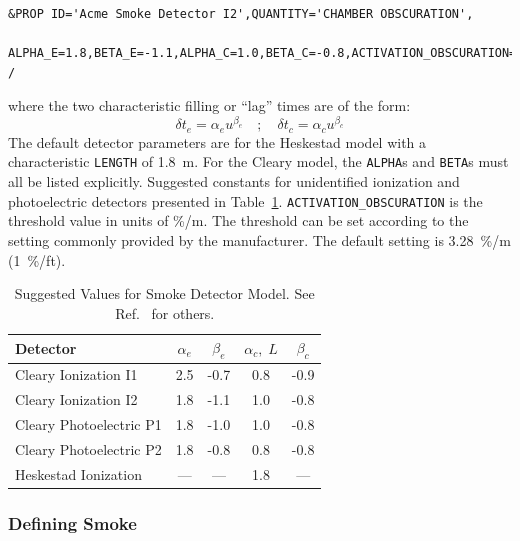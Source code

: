 \documentclass[11pt]{book}
\newcommand{\ct}{\tt\small}
\newcommand{\be}{\begin{equation}}
\newcommand{\ee}{\end{equation}}
\begin{document}
\footnotesize
\begin{verbatim}
&PROP ID='Acme Smoke Detector I2',QUANTITY='CHAMBER OBSCURATION',
      ALPHA_E=1.8,BETA_E=-1.1,ALPHA_C=1.0,BETA_C=-0.8,ACTIVATION_OBSCURATION=3.28 /
\end{verbatim}

\normalsize
\noindent
where the two characteristic filling or ``lag'' times are of the form:
\be \delta t_e = \alpha_e u^{\beta_e} \quad ; \quad \delta t_c = \alpha_c u^{\beta_c} \ee
The default detector parameters are for the Heskestad model with a characteristic {\ct LENGTH} of
1.8~m. For the Cleary model, the {\ct ALPHA}s and {\ct BETA}s must all be listed explicitly.
Suggested constants for unidentified ionization and photoelectric detectors
presented in Table~\ref{tab:sdvalues}.
{\ct ACTIVATION\_OBSCURATION} is the threshold value in units of \%/m.
The threshold can be set according to the setting commonly provided by the manufacturer.
The default setting is 3.28~\%/m (1~\%/ft).

\begin{table}[ht]
\caption[Suggested Values for Smoke Detector Model.]{Suggested Values for Smoke Detector Model. See Ref.~\cite{SFPE} for others.}
\vspace{0.1in}
\label{tab:sdvalues}
\begin{center}
\begin{tabular}{|l||c|c|c|c|}
\hline
Detector                      & $\alpha_e$  &  $\beta_e$   &  $\alpha_c, \; L$   &  $\beta_c$  \\ \hline \hline
Cleary Ionization    I1       & 2.5         & -0.7         &  0.8                &  -0.9      \\ \hline
Cleary Ionization    I2       & 1.8         & -1.1         &  1.0                &  -0.8      \\ \hline
Cleary Photoelectric P1       & 1.8         & -1.0         &  1.0                &  -0.8      \\ \hline
Cleary Photoelectric P2       & 1.8         & -0.8         &  0.8                &  -0.8      \\ \hline
Heskestad Ionization          & ---         & ---          &  1.8                &  ---       \\ \hline\end{tabular}
\end{center}
\end{table}

\subsubsection{Defining Smoke}
\label{info:alternative_smoke}
\end{document}
